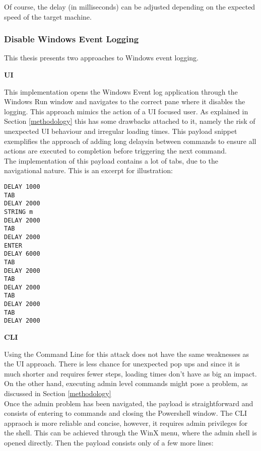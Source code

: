 Of course, the delay (in milliseconds) can be adjusted depending on the expected speed of the target machine. 




\subsubsection{Disable Windows Event Logging}

This thesis presents two approaches to Windows event logging.

\textbf{UI} 

This implementation opens the Windows Event log application through the Windows Run window and navigates to the correct pane where it disables the logging.
This approach mimics the action of a UI focused user. As explained in Section \ref{methodology} this has some drawbacks attached to it, namely the risk of unexpected UI behaviour and irregular loading times. This payload snippet exemplifies the approach of adding long delaysin between commands to ensure all actions are executed to completion before triggering the next command.\\
The implementation of this payload contains a lot of tabs, due to the navigational nature. This is an excerpt for illustration:

\begin{lstlisting}[caption={Exceprt: disable Windows Event Logging by navigating UI}, captionpos=b]
DELAY 1000
TAB
DELAY 2000
STRING m
DELAY 2000
TAB
DELAY 2000
ENTER
DELAY 6000
TAB
DELAY 2000
TAB
DELAY 2000
TAB
DELAY 2000
TAB
DELAY 2000
\end{lstlisting}

\textbf{CLI}

Using the Command Line for this attack does not have the same weaknesses as the UI approach. There is less chance for unexpected pop ups and since it is much shorter and requires fewer steps, loading times don't have as big an impact. On the other hand, executing admin level commands might pose a problem, as discussed in Section \ref{methodology} \\

Once the admin problem has been navigated, the payload is straightforward and consists of entering to commands and closing the Powershell window.
The CLI appraoch is more reliable and concise, however, it requires admin privileges for the shell. This can be achieved through the WinX menu, where the admin shell is opened directly. Then the payload consists only of a few more lines:

